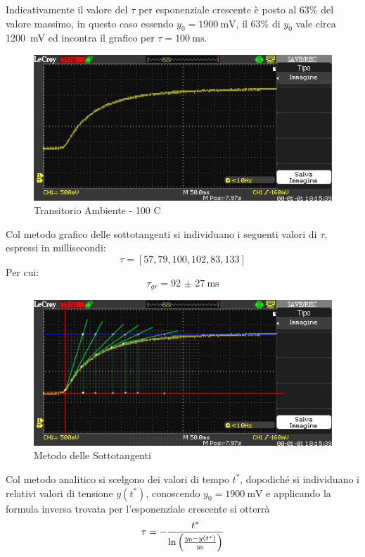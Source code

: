 \documentclass[a4paper, 12pt, twoside]{report}
\begin{document}
		Indicativamente il valore del $\tau$ per esponenziale crescente è posto al 63\% del valore massimo, in questo caso essendo $y_0 = \SI{1900}{\milli\volt}$, il 63\% di $y_0$ vale circa \SI{1200}{\milli\volt} ed incontra il grafico per $\tau=\SI{100}{\milli\second}$.		
		\begin{figure}[H]
			\centering
			\includegraphics[width=0.7\linewidth]{immaginioscillo/1}
			\caption[]{Transitorio Ambiente - 100 \degree C}
			\label{fig:1}
		\end{figure}	
		Col metodo grafico delle sottotangenti si individuano i seguenti valori di $\tau$, espressi in millisecondi:
		\[ \tau = [57, 79, 100, 102, 83, 133]\]
		Per cui:
		\[\tau_{gr} = \SI[separate-uncertainty = true]{92(27)}{\milli\second}\]		
		\begin{figure}[H]
			\centering
			\includegraphics[width=0.7\linewidth]{immaginioscillo/1+}
			\caption{Metodo delle Sottotangenti}
			\label{fig:2}
		\end{figure}	
		Col metodo analitico si scelgono dei valori di tempo $t^*$, dopodiché si individuano i relativi valori di tensione $y(t^*)$, conoscendo $y_0 = \SI{1900}{\milli\volt}$ e applicando la formula inversa trovata per l'esponenziale crescente si otterrà
		\[\tau = - \dfrac{t^*}{\ln\left(y_0-y(t^*)\over y_0\right)}\]		
\end{document}
